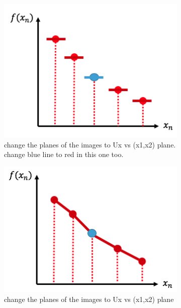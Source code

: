 \documentclass[12pt,a4paper]{report}
\begin{document}
\begin{itemize}
\begin{figure}[h]
	\centering
	\begin{subfigure}[b]{0.45\textwidth}
		\includegraphics[width=\textwidth]{flat_recon}
		\caption{change the planes of the images to Ux vs (x1,x2) plane. change blue line to red in this one too.}
	\end{subfigure}
	\begin{subfigure}[b]{0.45\textwidth}
	\includegraphics[width=\textwidth]{linear_recon}
	\caption{change the planes of the images to Ux vs (x1,x2) plane}
	\end{subfigure}
	\begin{subfigure}[b]{0.45\textwidth}

\end{subfigure}
\end{figure}
\end{itemize}
\end{document}
